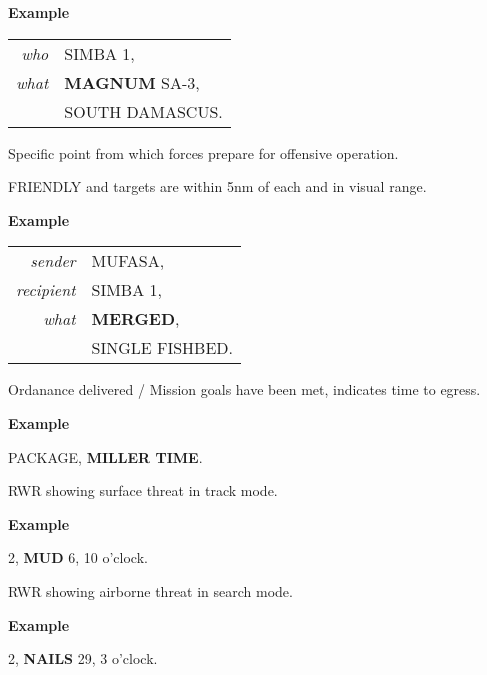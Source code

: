 \begin{tcoloritemize}
    \medskip
    \textbf{Example}
    \begin{center}
        \begin{tabular}{>{\itshape}r l}
            who &   SIMBA 1, \\
            what & \textbf{MAGNUM} SA-3, \\
            & SOUTH DAMASCUS. \\
        \end{tabular}
    \end{center}

    \blueitem[MARSHAL]
    Specific point from which forces prepare for offensive operation.

    \blueitem[MERGE]
    FRIENDLY and targets are within 5nm of each and in visual range.

    \medskip
    \textbf{Example}
    \begin{center}
        \begin{tabular}{>{\itshape}r l}
            sender & MUFASA, \\
            recipient & SIMBA 1, \\
            what & \textbf{MERGED}, \\
            & SINGLE FISHBED.
        \end{tabular}
    \end{center}

    Ordanance delivered / Mission goals have been met, indicates time to egress.

    \medskip
    \textbf{Example}
    \begin{center}
        \begin{minipage}{0.9\textwidth}
            PACKAGE, \textbf{MILLER TIME}.
        \end{minipage}
    \end{center}

    \blueitem[MUD]
    RWR showing surface threat in track mode.

    \medskip
    \textbf{Example}
    \begin{center}
        \begin{minipage}{0.9\textwidth}
            2, \textbf{MUD} 6, 10 o'clock.
        \end{minipage}
    \end{center}

    \blueitem[NAILS]
    RWR showing airborne threat in search mode.

    \medskip
    \textbf{Example}
    \begin{center}
        \begin{minipage}{0.9\textwidth}
            2, \textbf{NAILS} 29, 3 o'clock.
        \end{minipage}
    \end{center}
    

\end{tcoloritemize}
